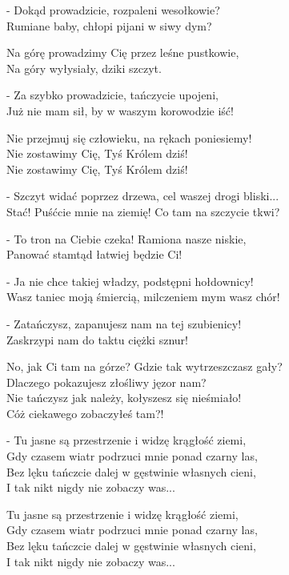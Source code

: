 \begin{text}
    - Dokąd prowadzicie, rozpaleni wesołkowie?\\
    Rumiane baby, chłopi pijani w siwy dym?

    Na górę prowadzimy Cię przez leśne pustkowie,\\
    Na góry wyłysiały, dziki szczyt.

    - Za szybko prowadzicie, tańczycie upojeni,\\
    Już nie mam sił, by w waszym korowodzie iść!

    Nie przejmuj się człowieku, na rękach poniesiemy!\\
    Nie zostawimy Cię, Tyś Królem dziś!\\
    Nie zostawimy Cię, Tyś Królem dziś!

    - Szczyt widać poprzez drzewa, cel waszej drogi bliski...\\
    Stać! Puśćcie mnie na ziemię! Co tam na szczycie tkwi?

    - To tron na Ciebie czeka! Ramiona nasze niskie,\\
    Panować stamtąd łatwiej będzie Ci!

    - Ja nie chce takiej władzy, podstępni hołdownicy!\\
    Wasz taniec moją śmiercią, milczeniem mym wasz chór!

    - Zatańczysz, zapanujesz nam na tej szubienicy!\\
    Zaskrzypi nam do taktu ciężki sznur!

    No, jak Ci tam na górze? Gdzie tak wytrzeszczasz gały?\\
    Dlaczego pokazujesz złośliwy jęzor nam?\\
    Nie tańczysz jak należy, kołyszesz się nieśmiało!\\
    Cóż ciekawego zobaczyłeś tam?!

    - Tu jasne są przestrzenie i widzę krągłość ziemi,\\
    Gdy czasem wiatr podrzuci mnie ponad czarny las,\\
    Bez lęku tańczcie dalej w gęstwinie własnych cieni,\\
    I tak nikt nigdy nie zobaczy was...

    Tu jasne są przestrzenie i widzę krągłość ziemi,\\
    Gdy czasem wiatr podrzuci mnie ponad czarny las,\\
    Bez lęku tańczcie dalej w gęstwinie własnych cieni,\\
    I tak nikt nigdy nie zobaczy was...
\end{text}
